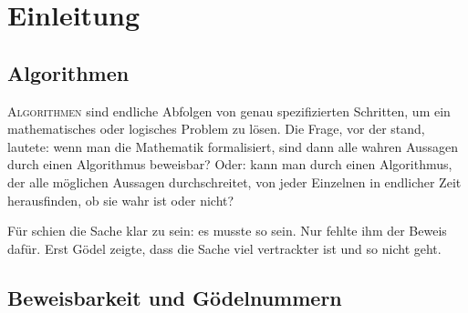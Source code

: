 \section*{Einleitung}

\let\originalthefootnote\thefootnote
\renewcommand*{\thefootnote}{\fnsymbol{footnote}}

\subsection*{Algorithmen}

\lettrine[nindent=0em]{\color{purple}A}{lgorithmen} sind endliche Abfolgen von
genau spezifizierten Schritten, um ein mathematisches oder logisches Problem zu lösen.
Die Frage, vor der  stand, lautete: wenn man die Mathematik formalisiert,
sind dann alle wahren Aussagen durch einen Algorithmus beweisbar? Oder: kann man durch
einen Algorithmus, der alle möglichen Aussagen durchschreitet, von jeder Einzelnen
in endlicher Zeit herausfinden, ob sie wahr ist oder nicht?

Für  schien die Sache klar zu sein: es musste so sein. Nur fehlte ihm der Beweis
dafür. Erst Gödel zeigte, dass die Sache viel vertrackter ist und so nicht geht.

\subsection*{Beweisbarkeit und Gödelnummern}

